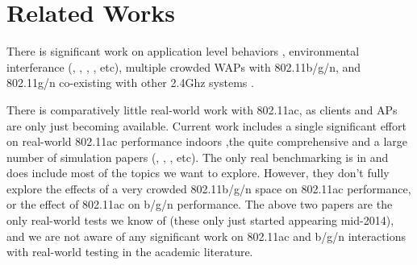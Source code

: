 \section{Related Works}
There is significant work on application level behaviors
\cite{verkaik2009softspeak}, environmental interferance
(\cite{kamerman1997microwave}, \cite{golmie2003interference},
\cite{shin2007mutual}, \cite{gummadi2007understanding}, etc), multiple
crowded WAPs \cite{fuxjager2007myth} with 802.11b/g/n, and 802.11g/n
co-existing with other 2.4Ghz systems \cite{petrova2007interference}.

There is comparatively little real-world work with 802.11ac, as
clients and APs are only just becoming available. Current work
includes a single significant effort on real-world 802.11ac
performance indoors \cite{dianu2014measurement},the quite
comprehensive \cite{zeng2014first} and a large number of simulation
papers (\cite{bellalta2012performance}, \cite{ong2011ieee},
\cite{redieteab2012mu} , etc). The only real benchmarking is in
\cite{zeng2014first} and does include most of the topics we want to
explore. However, they don't fully explore the effects of a very
crowded 802.11b/g/n space on 802.11ac performance, or the effect of
802.11ac on b/g/n performance. The above two papers are the only
real-world tests we know of (these only just started appearing
mid-2014), and we are not aware of any significant work on 802.11ac
and b/g/n interactions with real-world testing in the academic
literature.
